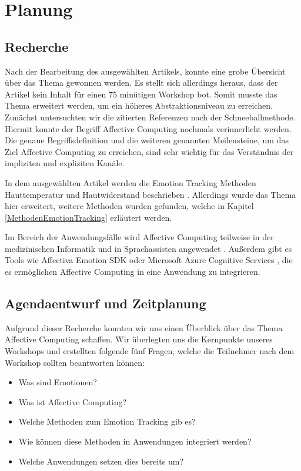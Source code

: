 \section{Planung}
\subsection{Recherche}
Nach der Bearbeitung des ausgewählten Artikels, konnte eine grobe Übersicht über das Thema gewonnen werden. Es stellt sich allerdings heraus, dass der Artikel kein Inhalt für einen 75 minütigen Workshop bot. Somit musste das Thema erweitert werden, um ein höheres Abstraktionsniveau zu erreichen. Zunächst untersuchten wir die zitierten Referenzen nach der Schneeballmethode. Hiermit konnte der Begriff Affective Computing nochmals verinnerlicht werden\cite{Picard}. Die genaue Begriffsdefinition und die weiteren genannten Meilensteine, um das Ziel Affective Computing zu erreichen, sind sehr wichtig für das Verständnis der impliziten und expliziten Kanäle\cite{KimNS}. 

In dem ausgewählten Artikel werden die Emotion Tracking Methoden Hauttemperatur und Hautwiderstand beschrieben \cite{cowie}\cite{zeng}\cite{lee}. Allerdings wurde das Thema hier erweitert, weitere Methoden wurden gefunden, welche in Kapitel \ref{MethodenEmotionTracking} erläutert werden. 

Im Bereich der Anwendungsfälle wird Affective Computing teilweise in der medizinischen Informatik und in Sprachassisten angewendet \cite{medicine}\cite{sprachassi}. Außerdem gibt es Tools wie Affectiva Emotion SDK \cite{affectiva} oder Microsoft Azure Cognitive Services \cite{MicrosoftAzure}, die es ermöglichen Affective Computing in eine Anwendung zu integrieren.

\subsection{Agendaentwurf und Zeitplanung}
Aufgrund dieser Recherche konnten wir uns einen Überblick über das Thema Affective Computing schaffen. Wir überlegten uns die Kernpunkte unseres Workshops und erstellten folgende fünf Fragen, welche die Teilnehmer nach dem Workshop sollten beantworten können:

\begin{itemize}
	\item Was sind Emotionen?
	\item Was ist Affective Computing?
	\item Welche Methoden zum Emotion Tracking gib es?
	\item Wie können diese Methoden in Anwendungen integriert werden?
	\item Welche Anwendungen setzen dies bereits um? 
\end{itemize}

